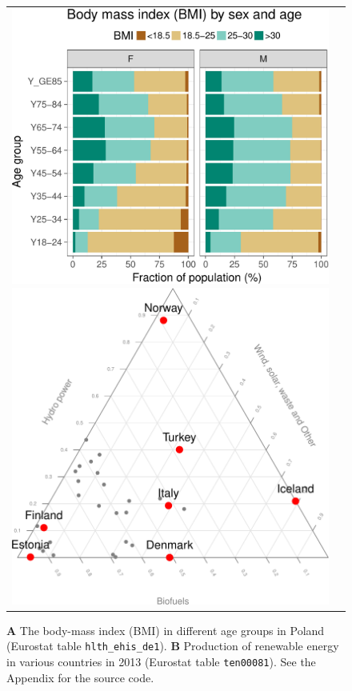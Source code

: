 \begin{figure}
\begin{center}
\begin{tabular}{cc}
\includegraphics{2017-manu-bmi-1}
\includegraphics{2017-manu-energy-1}
\end{tabular}
\end{center}
\caption{{\bf A} The body-mass index (BMI) in different age groups in Poland (Eurostat table \texttt{hlth\_ehis\_de1}). {\bf B} Production of renewable energy in various countries in 2013 (Eurostat table \texttt{ten00081}). See the Appendix for the source code.}
\label{fig:bmi}
\end{figure}




